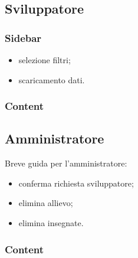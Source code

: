 \subsection{Sviluppatore}
\subsubsection{Sidebar}
\begin{itemize}
\item selezione filtri;
\item scaricamento dati.
\end{itemize}
\subsubsection{Content}
\subsection{Amministratore}
Breve guida per l'amministratore:
\begin{itemize}
\item conferma richiesta sviluppatore;
\item elimina allievo;
\item elimina insegnate.
\end{itemize}
\subsubsection{Content}
